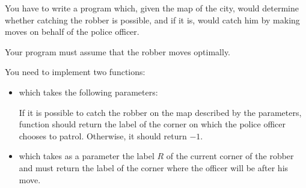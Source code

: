 \documentclass{boi2014-fi}
\begin{document}
    \Task
    You have to write a program which, given the map of the city,
    would determine whether catching the robber is possible, and if it is,
    would catch him by making moves on behalf of the police officer.

    Your program must assume that the robber moves optimally.

    \Implementation
    You need to implement two functions:
    \begin{itemize}
        \item {} which takes the following parameters:

        If it is possible to catch the robber on the map described
        by the parameters, function  should return the
        label of the corner on which the police officer chooses to patrol.
        Otherwise, it should return $-1$.

        \item {} which takes as a
            parameter the label $R$ of the current corner of the robber
            and must return the label of the corner where the officer
            will be after his move.
    \end{itemize}
\end{document}
